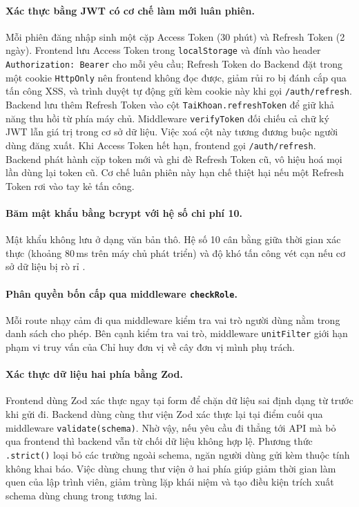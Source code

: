 \documentclass[../DoAn.tex]{subfiles}
\begin{document}
\paragraph{Xác thực bằng JWT có cơ chế làm mới luân phiên.} Mỗi phiên đăng nhập sinh một cặp Access Token (30 phút) và Refresh Token (2 ngày). Frontend lưu Access Token trong \texttt{localStorage} và đính vào header \texttt{Authorization: Bearer} cho mỗi yêu cầu; Refresh Token do Backend đặt trong một cookie \texttt{HttpOnly} nên frontend không đọc được, giảm rủi ro bị đánh cắp qua tấn công XSS, và trình duyệt tự động gửi kèm cookie này khi gọi \texttt{/auth/refresh}. Backend lưu thêm Refresh Token vào cột \texttt{TaiKhoan.refreshToken} để giữ khả năng thu hồi từ phía máy chủ. Middleware \texttt{verifyToken} đối chiếu cả chữ ký JWT lẫn giá trị trong cơ sở dữ liệu. Việc xoá cột này tương đương buộc người dùng đăng xuất. Khi Access Token hết hạn, frontend gọi \texttt{/auth/refresh}. Backend phát hành cặp token mới và ghi đè Refresh Token cũ, vô hiệu hoá mọi lần dùng lại token cũ. Cơ chế luân phiên này hạn chế thiệt hại nếu một Refresh Token rơi vào tay kẻ tấn công.

\paragraph{Băm mật khẩu bằng bcrypt với hệ số chi phí 10.} Mật khẩu không lưu ở dạng văn bản thô. Hệ số 10 cân bằng giữa thời gian xác thực (khoảng 80\,ms trên máy chủ phát triển) và độ khó tấn công vét cạn nếu cơ sở dữ liệu bị rò rỉ \cite{bcrypt}.

\paragraph{Phân quyền bốn cấp qua middleware \texttt{checkRole}.} Mỗi route nhạy cảm đi qua middleware kiểm tra vai trò người dùng nằm trong danh sách cho phép. Bên cạnh kiểm tra vai trò, middleware \texttt{unitFilter} giới hạn phạm vi truy vấn của Chỉ huy đơn vị về cây đơn vị mình phụ trách.

\paragraph{Xác thực dữ liệu hai phía bằng Zod.} Frontend dùng Zod \cite{zoddocs} xác thực ngay tại form để chặn dữ liệu sai định dạng từ trước khi gửi đi. Backend dùng cùng thư viện Zod xác thực lại tại điểm cuối qua middleware \texttt{validate(schema)}. Nhờ vậy, nếu yêu cầu đi thẳng tới API mà bỏ qua frontend thì backend vẫn từ chối dữ liệu không hợp lệ. Phương thức \texttt{.strict()} loại bỏ các trường ngoài schema, ngăn người dùng gửi kèm thuộc tính không khai báo. Việc dùng chung thư viện ở hai phía giúp giảm thời gian làm quen của lập trình viên, giảm trùng lặp khái niệm và tạo điều kiện trích xuất schema dùng chung trong tương lai.
\end{document}
